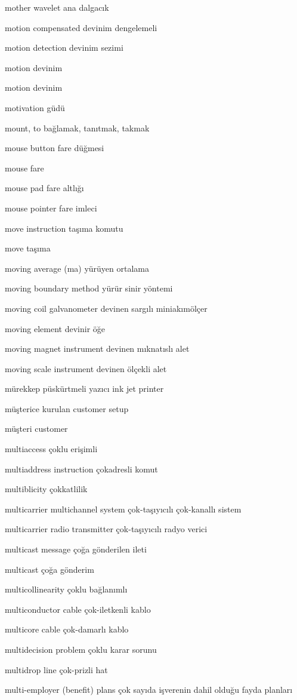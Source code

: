 \documentclass[12pt,fleqn]{article}\usepackage{../../common}
\begin{document}
mother wavelet ana dalgacık

motion compensated devinim dengelemeli

motion detection devinim sezimi

motion devinim

motion devinim

motivation güdü

mount, to bağlamak, tanıtmak, takmak

mouse button fare düğmesi

mouse fare

mouse pad fare altlığı

mouse pointer fare imleci

move instruction taşıma komutu

move taşıma

moving average (ma) yürüyen ortalama

moving boundary method yürür sinir yöntemi

moving coil galvanometer devinen sargılı miniakımölçer

moving element devinir öğe

moving magnet instrument devinen mıknatıslı alet

moving scale instrument devinen ölçekli alet

mürekkep püskürtmeli yazıcı ink jet printer

müşterice kurulan customer setup

müşteri customer

multiaccess çoklu erişimli

multiaddress instruction çokadresli komut

multiblicity çokkatlilik

multicarrier multichannel system çok-taşıyıcılı çok-kanallı sistem

multicarrier radio transmitter çok-taşıyıcılı radyo verici

multicast message çoğa gönderilen ileti

multicast çoğa gönderim

multicollinearity çoklu bağlanımlı

multiconductor cable çok-iletkenli kablo

multicore cable çok-damarlı kablo

multidecision problem çoklu karar sorunu

multidrop line çok-prizli hat

multi-employer (benefit) plans çok sayıda işverenin dahil olduğu fayda planları
\end{document}
